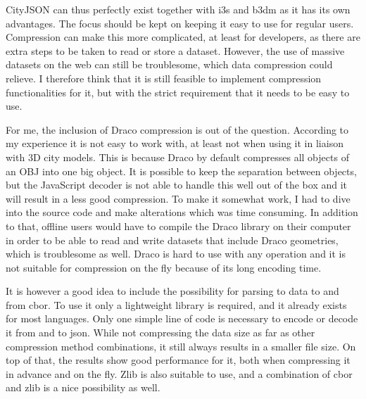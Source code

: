 CityJSON can thus perfectly exist together with \ac{i3s} and \ac{b3dm} as it has its own advantages.
The focus should be kept on keeping it easy to use for regular users.
Compression can make this more complicated, at least for developers, as there are extra steps to be taken to read or store a dataset.
However, the use of massive datasets on the web can still be troublesome, which data compression could relieve.
I therefore think that it is still feasible to implement compression functionalities for it, but with the strict requirement that it needs to be easy to use.

For me, the inclusion of Draco compression is out of the question.
According to my experience it is not easy to work with, at least not when using it in liaison with 3D city models.
This is because Draco by default compresses all objects of an OBJ into one big object.
It is possible to keep the separation between objects, but the JavaScript decoder is not able to handle this well out of the box and it will result in a less good compression.
To make it somewhat work, I had to dive into the source code and make alterations which was time consuming.
In addition to that, offline users would have to compile the Draco library on their computer in order to be able to read and write datasets that include Draco geometries, which is troublesome as well.
Draco is hard to use with any operation and it is not suitable for compression on the fly because of its long encoding time.


It is however a good idea to include the possibility for parsing to data to and from \ac{cbor}.
To use it only a lightweight library is required, and it already exists for most languages.
Only one simple line of code is necessary to encode or decode it from and to \ac{json}.
While not compressing the data size as far as other compression method combinations, it still always results in a smaller file size. 
On top of that, the results show good performance for it, both when compressing it in advance and on the fly.
Zlib is also suitable to use, and a combination of \ac{cbor} and zlib is a nice possibility as well.






